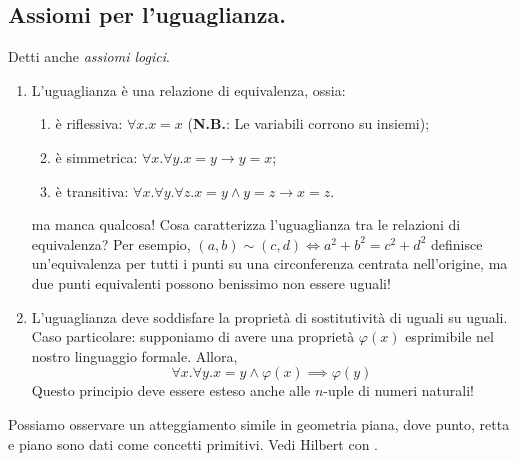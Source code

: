 \subsection{Assiomi per l'uguaglianza.}
Detti anche \emph{assiomi logici}.
\begin{enumerate}
  \item L'uguaglianza è una relazione di equivalenza, ossia:
  \begin{enumerate}
    \item è riflessiva: \(\forall x. x = x\) ({\bf N.B.}: Le variabili corrono su insiemi);
    \item è simmetrica: \(\forall x. \forall y. x = y \to y = x\);
    \item è transitiva: \(\forall x. \forall y. \forall z. x = y \land y = z \to x = z\).
  \end{enumerate}
  ma manca qualcosa! Cosa caratterizza l'uguaglianza tra le relazioni di equivalenza? Per esempio, \((a,b) \sim (c,d) \iff a^2 + b^2 = c^2 + d^2\) definisce un'equivalenza per tutti i punti su una circonferenza centrata nell'origine, ma due punti equivalenti possono benissimo non essere uguali!
  \item L'uguaglianza deve soddisfare la proprietà di sostitutività di uguali su uguali. Caso particolare: supponiamo di avere una proprietà \(\varphi(x)\) esprimibile nel nostro linguaggio formale. Allora,
  \begin{equation}
    \forall x. \forall y. x=y \land \varphi(x) \implies \varphi(y)
  \end{equation}
  Questo principio deve essere esteso anche alle \(n\)-uple di numeri naturali!
\end{enumerate}

Possiamo osservare un atteggiamento simile in geometria piana, dove punto, retta e piano sono dati come concetti primitivi. Vedi Hilbert con .
